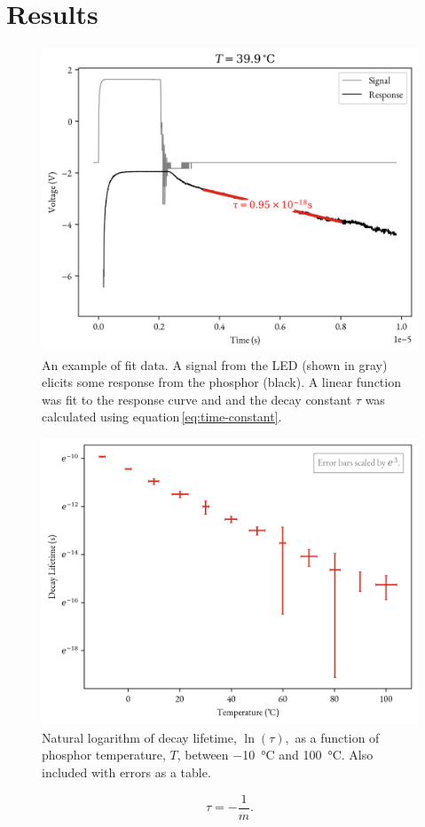 \documentclass[12pt]{article}
\begin{document}
  \section*{Results}{
    \begin{figure}
        \centering
        \includegraphics[width=\linewidth]{39.9C_fit.png}
        \caption{An example of fit data. A signal from the LED (shown in gray) elicits some response from the phosphor (black). A linear function was fit to the response curve and and the decay constant $\tau$ was calculated using equation\,\ref{eq:time-constant}.}
        \label{fig:V-vs-t}
    \end{figure}
    \begin{figure}
        \centering
        \includegraphics[width=\linewidth]{image.png}
        \caption{Natural logarithm of decay lifetime, $\ln(\tau),$ as a function of phosphor temperature, $T$, between \SI{-10}{\degreeCelsius} and \SI{100}{\degreeCelsius}.  Also included with errors as a table.} %
        \label{fig:tau-vs-T}
    \end{figure}

    \begin{equation}
        \tau = -\frac{1}{m}.
        \label{eq:time-constant}
    \end{equation}
    }
\end{document}

